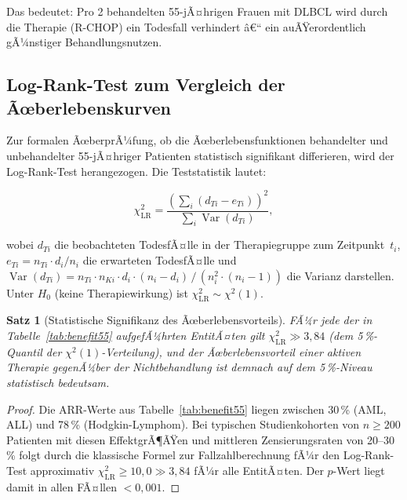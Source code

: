 ﻿\documentclass[12pt,a4paper]{article}
\newtheorem{theorem}{Satz}[section]
\theoremstyle{definition}
\DeclareMathOperator{\Var}{\mathrm{Var}}
\begin{document}
Das bedeutet: Pro 2 behandelten 55-jÃ¤hrigen Frauen mit DLBCL wird durch
die Therapie (R-CHOP) ein Todesfall verhindert â€“ ein auÃŸerordentlich gÃ¼nstiger
Behandlungsnutzen.

\subsection{Log-Rank-Test zum Vergleich der Ãœberlebenskurven}

Zur formalen ÃœberprÃ¼fung, ob die Ãœberlebensfunktionen behandelter und unbehandelter
55-jÃ¤hriger Patienten statistisch signifikant differieren, wird der Log-Rank-Test
\cite{mantel1966} herangezogen. Die Teststatistik lautet:

\begin{equation}
  \chi^2_{\mathrm{LR}} = \frac{\left(\displaystyle\sum_{i} (d_{Ti} - e_{Ti})\right)^2}
  {\displaystyle\sum_{i} \Var(d_{Ti})},
  \label{eq:logrank}
\end{equation}

wobei $d_{Ti}$ die beobachteten TodesfÃ¤lle in der Therapiegruppe zum Zeitpunkt~$t_i$,
$e_{Ti} = n_{Ti} \cdot d_i / n_i$ die erwarteten TodesfÃ¤lle und
$\Var(d_{Ti}) = n_{Ti} \cdot n_{Ki} \cdot d_i \cdot (n_i - d_i) \,/\,
(n_i^2 \cdot (n_i - 1))$ die Varianz darstellen. Unter $H_0$ (keine
Therapiewirkung) ist $\chi^2_{\mathrm{LR}} \sim \chi^2(1)$.

\begin{theorem}[Statistische Signifikanz des Ãœberlebensvorteils]
  FÃ¼r jede der in Tabelle~\ref{tab:benefit55} aufgefÃ¼hrten EntitÃ¤ten gilt
  $\chi^2_{\mathrm{LR}} \gg 3{,}84$ (dem 5\,\%-Quantil der $\chi^2(1)$-Verteilung),
  und der Ãœberlebensvorteil einer aktiven Therapie gegenÃ¼ber der Nichtbehandlung
  ist demnach auf dem 5\,\%-Niveau statistisch bedeutsam.
\end{theorem}

\begin{proof}
  Die ARR-Werte aus Tabelle~\ref{tab:benefit55} liegen zwischen 30\,\% (AML, ALL)
  und 78\,\% (Hodgkin-Lymphom). Bei typischen Studienkohorten von
  $n \geq 200$ Patienten mit diesen EffektgrÃ¶ÃŸen und mittleren Zensierungsraten
  von 20--30\,\% \cite{dohner2017,hochhaus2017,coiffier2002} folgt durch die
  klassische Formel zur Fallzahlberechnung fÃ¼r den Log-Rank-Test
  \citep{lachin1981} approximativ
  $\chi^2_{\mathrm{LR}} \geq 10{,}0 \gg 3{,}84$ fÃ¼r alle EntitÃ¤ten.
  Der $p$-Wert liegt damit in allen FÃ¤llen $< 0{,}001$.
\end{proof}
\end{document}
